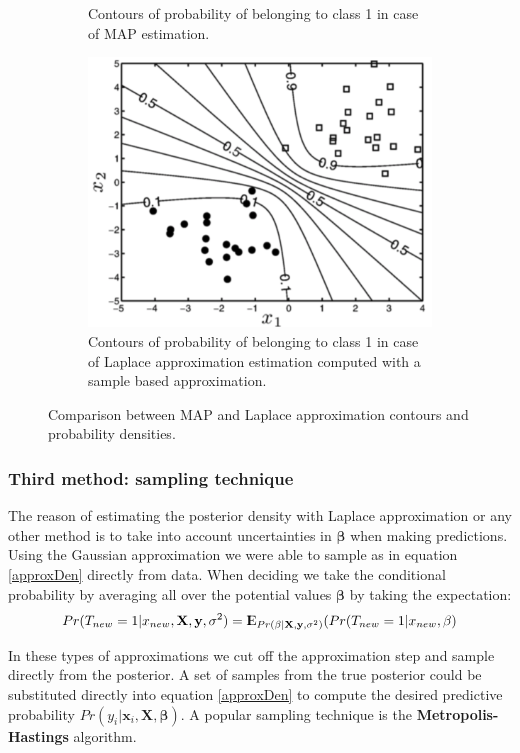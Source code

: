 \documentclass[12pt, letterpaper]{article}
\theoremstyle{definition}
\newcommand{\E}{{\rm I\kern-.3em E}}
\newcommand{\X}{\mathrm{\mathbf{X}}}
\newcommand{\y}{\mathbf{y}}
\newcommand{\be}{\mathbf{\beta}}
\newcommand{\x}{\mathbf{x}}
\DeclarePairedDelimiter\autobracket{(}{)}
\newcommand{\br}[1]{\autobracket*{#1}}
\begin{document}
\begin{figure}
\begin{subfigure}[t]{0.5\textwidth}
\caption{Contours of probability of belonging to class 1 in case of MAP estimation.}
\label{MAP2}
\end{subfigure}
\hfill
\begin{subfigure}[t]{0.5\textwidth}
\centering
\includegraphics[width=0.8\linewidth]{img/laplace2}
\caption{Contours of probability of belonging to class 1 in case of Laplace approximation estimation computed with a sample based approximation.}
\label{laplace2}
\end{subfigure}
\caption{Comparison between MAP and Laplace approximation contours and probability densities.}
\end{figure}

\subsubsection{Third method: sampling technique	}
The reason of estimating the posterior density with Laplace approximation or any other method is to take into account uncertainties in $\be$ when making predictions. Using the Gaussian approximation we were able to sample as in equation \autoref{approxDen} directly from data. When deciding we take the conditional probability by averaging all over the potential values $\be$ by taking the expectation:
\begin{equation}
Pr(T_{new}=1| x_{new}, \X, \y, \sigma^2) = \E_{Pr(\be|\X, \y, \sigma^2)}\br{Pr(T_{new}=1|x_{new},\be}
\end{equation}

In these types of approximations we cut off the approximation step and sample directly from the posterior. A set of samples from the true posterior could be substituted directly into equation \autoref{approxDen} to compute the desired predictive probability $Pr(y_i|\x_i, \X, \be)$. A popular sampling technique is the \textbf{Metropolis-Hastings} algorithm.
\end{document}
